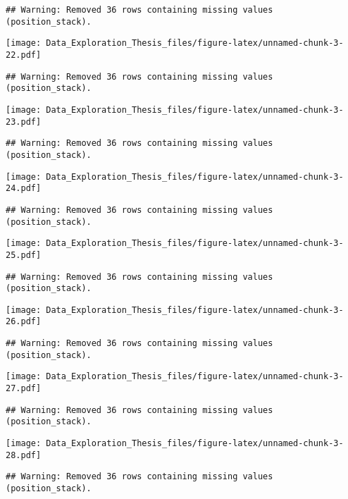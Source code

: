 \documentclass[]{article}
\begin{document}
\begin{verbatim}
## Warning: Removed 36 rows containing missing values (position_stack).
\end{verbatim}

\texttt{[image: Data\_Exploration\_Thesis\_files/figure-latex/unnamed-chunk-3-22.pdf]}

\begin{verbatim}
## Warning: Removed 36 rows containing missing values (position_stack).
\end{verbatim}

\texttt{[image: Data\_Exploration\_Thesis\_files/figure-latex/unnamed-chunk-3-23.pdf]}

\begin{verbatim}
## Warning: Removed 36 rows containing missing values (position_stack).
\end{verbatim}

\texttt{[image: Data\_Exploration\_Thesis\_files/figure-latex/unnamed-chunk-3-24.pdf]}

\begin{verbatim}
## Warning: Removed 36 rows containing missing values (position_stack).
\end{verbatim}

\texttt{[image: Data\_Exploration\_Thesis\_files/figure-latex/unnamed-chunk-3-25.pdf]}

\begin{verbatim}
## Warning: Removed 36 rows containing missing values (position_stack).
\end{verbatim}

\texttt{[image: Data\_Exploration\_Thesis\_files/figure-latex/unnamed-chunk-3-26.pdf]}

\begin{verbatim}
## Warning: Removed 36 rows containing missing values (position_stack).
\end{verbatim}

\texttt{[image: Data\_Exploration\_Thesis\_files/figure-latex/unnamed-chunk-3-27.pdf]}

\begin{verbatim}
## Warning: Removed 36 rows containing missing values (position_stack).
\end{verbatim}

\texttt{[image: Data\_Exploration\_Thesis\_files/figure-latex/unnamed-chunk-3-28.pdf]}

\begin{verbatim}
## Warning: Removed 36 rows containing missing values (position_stack).
\end{verbatim}
\end{document}
